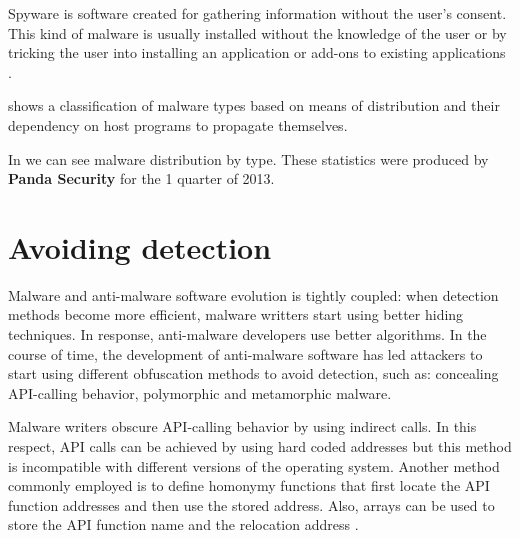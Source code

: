 Spyware is software created for gathering information without the user's consent. This kind of malware is usually installed without the knowledge of the user or by tricking the user into installing an application or add-ons to existing applications \cite{mal-behavior-analysis}.


 shows a classification of malware types based on means of distribution and their dependency on host programs to propagate themselves.


In  we can see malware distribution by type. These statistics were produced by \textbf{Panda Security} for the 1 quarter of 2013. 


\section{Avoiding detection}
\label{sec:avoid-det}

Malware and anti-malware software evolution is tightly coupled: when detection methods become more efficient, malware writters start using better hiding techniques. In response, anti-malware developers use better algorithms. In the course of time, the development of anti-malware software has led attackers to start using different obfuscation methods to avoid detection, such as: concealing API-calling behavior, polymorphic and metamorphic malware.

Malware writers obscure API-calling behavior by using indirect calls. In this respect, API calls can be achieved by using hard coded addresses but this method is incompatible with different versions of the operating system. Another method commonly employed is to define homonymy functions that first locate the API function addresses and then use the stored address. Also, arrays can be used to store the API function name and the relocation address \cite{static-detection-behavior}.


